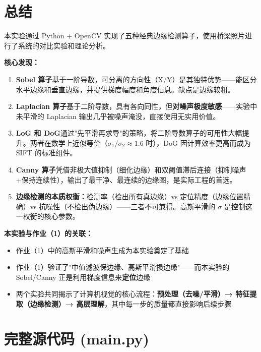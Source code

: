 \documentclass[12pt,a4paper]{ctexart}
\begin{document}
\newpage

\section{总结}

本实验通过 Python + OpenCV 实现了五种经典边缘检测算子，使用桥梁照片进行了系统的对比实验和理论分析。

\textbf{核心发现：}

\begin{enumerate}[leftmargin=*]
    \item \textbf{Sobel 算子}基于一阶导数，可分离的方向性（X/Y）是其独特优势——能区分水平边缘和垂直边缘，并提供梯度幅度和角度信息。缺点是边缘较粗。
    \item \textbf{Laplacian 算子}基于二阶导数，具有各向同性，但\textbf{对噪声极度敏感}——实验中未平滑的 Laplacian 输出几乎被噪声淹没，直接使用无实用价值。
    \item \textbf{LoG 和 DoG}通过"先平滑再求导"的策略，将二阶导数算子的可用性大幅提升。两者在数学上近似等价（$\sigma_1/\sigma_2\approx 1.6$ 时），DoG 因计算效率更高而成为 SIFT 的标准组件。
    \item \textbf{Canny 算子}凭借非极大值抑制（细化边缘）和双阈值滞后连接（抑制噪声+保持连续性），输出了最干净、最连续的边缘图，是实际工程的首选。
    \item \textbf{边缘检测的本质权衡：}检测率（检出所有真边缘）vs 定位精度（边缘位置精确）vs 抗噪性（不检出伪边缘）——三者不可兼得。高斯平滑的 $\sigma$ 是控制这一权衡的核心参数。
\end{enumerate}

\vspace{0.5cm}
\noindent\textbf{本实验与作业（1）的关联：}
\begin{itemize}
    \item 作业（1）中的高斯平滑和噪声生成为本实验奠定了基础
    \item 作业（1）验证了"中值滤波保边缘、高斯平滑损边缘"——而本实验的 Sobel/Canny 正是利用梯度信息来\textbf{定位}边缘
    \item 两个实验共同揭示了计算机视觉的核心流程：\textbf{预处理（去噪/平滑）→ 特征提取（边缘检测）→ 高层理解}，其中每一步的质量都直接影响后续步骤
\end{itemize}

\newpage

\appendix
\section{完整源代码 (main.py)}
\end{document}
